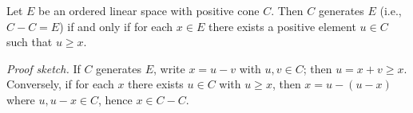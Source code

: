 Let $E$ be an ordered linear space with positive cone $C$. Then $C$ generates $E$ (i.e., $C - C = E$) if and only if for each $x \in E$ there exists a positive element $u \in C$ such that $u \geq x$.

\textit{Proof sketch.} If $C$ generates $E$, write $x = u - v$ with $u, v \in C$; then $u = x + v \geq x$. Conversely, if for each $x$ there exists $u \in C$ with $u \geq x$, then $x = u - (u - x)$ where $u, u-x \in C$, hence $x \in C - C$.
